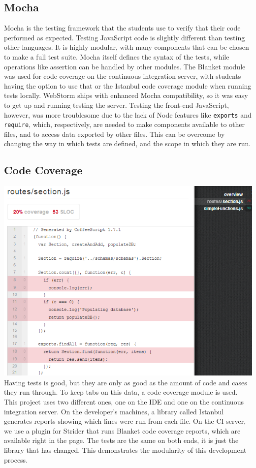 \documentclass[12pt]{article}
\newcommand{\comment}[1]{{\bf \tt  {#1}}}
\newcommand{\emcomment}[1]{\textcolor{ForestGreen}{\comment{Elena: {#1}}}}
\newcommand{\code}[1]{{\texttt {#1}}}
\begin{document}
\subsection{Mocha}\label{sec:mocha}
Mocha is the testing framework that the students use to verify that their code performed as expected. Testing JavaScript code is slightly different than testing other languages. It is highly modular, with many components that can be chosen to make a full test suite. Mocha itself defines the syntax of the tests, while operations like assertion can be handled by other modules. The Blanket module was used for code coverage on the continuous integration server, with students having the option to use that or the Istanbul code coverage module when running tests locally. WebStorm ships with enhanced Mocha compatibility, so it was easy to get up and running testing the server. Testing the front-end JavaScript, however, was more troublesome due to the lack of Node features like \code{exports} and \code{require}, which, respectively, are needed to make components available to other files, and to access data exported by other files. This can be overcome by changing the way in which tests are defined, and the scope in which they are run.


\subsection{Code Coverage}\label{sec:coverage}
\includegraphics[width=\linewidth]{img/strider_3.png}
Having tests is good, but they are only as good as the amount of code and cases they run through. To keep tabs on this data, a code coverage module is used. This project uses two different ones, one on the IDE and one on the continuous integration server. On the developer's machines, a library called Istanbul generates reports showing which lines were run from each file. On the CI server, we use a plugin for Strider that runs Blanket code coverage reports, which are available right in the page. The tests are the same on both ends, it is just the library that has changed. This demonstrates the modularity of this development process.
\end{document}
